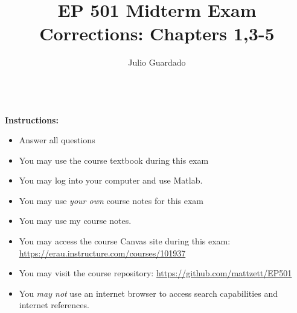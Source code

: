 \documentclass{article}
\begin{document}
\title{EP 501 Midterm Exam Corrections:  Chapters 1,3-5}

\author{Julio Guardado}

\maketitle


~\\
\textbf{Instructions:}  
\begin{itemize}
  \item  Answer all questions
  \item  You may use the course textbook during this exam
  \item  You may log into your computer and use Matlab.
  \item  You may use \emph{your own} course notes for this exam
  \item  You may use my course notes.  
  \item  You may access the course Canvas site during this exam:  \url{https://erau.instructure.com/courses/101937}
  \item  You may visit the course repository:  \url{https://github.com/mattzett/EP501}  
  \item  You \emph{may not} use an internet browser to access search capabilities and internet references.  
\end{itemize}


\pagebreak
\end{document}
